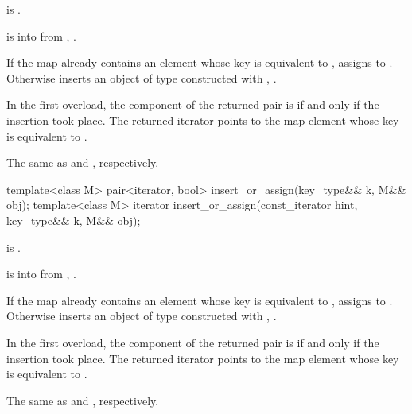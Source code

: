 \begin{itemdescr}
\pnum
\mandates
{} is .

\pnum
\expects
{} is  into 
from , .

\pnum
\effects
If the map already contains an element 
whose key is equivalent to ,
assigns  to .
Otherwise inserts an object of type 
constructed with , .

\pnum
\returns
In the first overload,
the  component of the returned pair is 
if and only if the insertion took place.
The returned iterator points to the map element
whose key is equivalent to .

\pnum
\complexity
The same as  and ,
respectively.
\end{itemdescr}

%
\begin{itemdecl}
template<class M>
  pair<iterator, bool> insert_or_assign(key_type&& k, M&& obj);
template<class M>
  iterator insert_or_assign(const_iterator hint, key_type&& k, M&& obj);
\end{itemdecl}

\begin{itemdescr}
\pnum
\mandates
{} is .

\pnum
\expects
{} is  into 
from , .

\pnum
\effects
If the map already contains an element 
whose key is equivalent to ,
assigns  to .
Otherwise inserts an object of type 
constructed with , .

\pnum
\returns
In the first overload,
the  component of the returned pair is 
if and only if the insertion took place.
The returned iterator points to the map element
whose key is equivalent to .

\pnum
\complexity
The same as  and ,
respectively.
\end{itemdescr}

